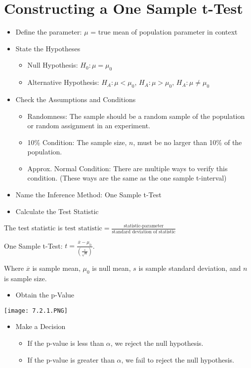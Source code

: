 \documentclass[../stats.tex]{subfiles}
\begin{document}
\section{Constructing a One Sample t-Test}
\begin{itemize}
    \item Define the parameter: $\mu$ = true mean of {population parameter in context}
    \item State the Hypotheses 
    \begin{itemize}
        \item Null Hypothesis: $H_0: \mu=\mu_0$
        \item Alternative Hypothesis: $H_A:\mu<\mu_0$, $H_A:\mu>\mu_0$, $H_A: \mu\neq \mu_0$
    \end{itemize}
    \item Check the Assumptions and Conditions 
    \begin{itemize}
        \item Randomness: The sample should be a random sample of the population or random assignment in an experiment.
        \item 10\% Condition: The sample size, $n$, must be no larger than 10\% of the population.
        \item Approx. Normal Condition: There are multiple ways to verify this condition. (These ways are the same as the one sample t-interval)
    \end{itemize}
    \item Name the Inference Method: One Sample t-Test 
    \item Calculate the Test Statistic 
\end{itemize}

The test statistic is $\text{test statistic}=\frac{\text{statistic-parameter}}{\text{standard deviation of statistic}}$

One Sample t-Test: $t=\frac{\overline{x}-\mu_0}{\left(\frac{s}{\sqrt{n}}\right)}$.

Where $\overline{x}$ is sample mean, $\mu_0$ is null mean, $s$ is sample standard deviation, and $n$ is sample size.

\begin{itemize}
    \item Obtain the p-Value 
\end{itemize}
\begin{center}
    \texttt{[image: 7.2.1.PNG]}
\end{center}

\begin{itemize}
    \item Make a Decision 
    \begin{itemize}
        \item If the p-value is less than $\alpha$, we reject the null hypothesis.
        \item If the p-value is greater than $\alpha$, we fail to reject the null hypothesis.
    \end{itemize}
\end{itemize}
\end{document}
